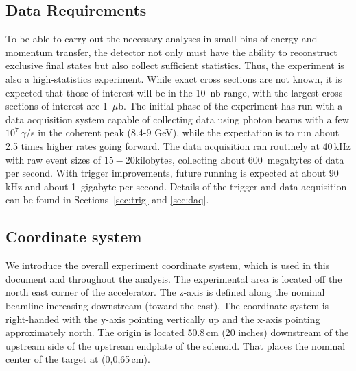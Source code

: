 \subsection{Data Requirements \label{sec:intro:data_requirements}}
To be able to carry out the necessary analyses in small bins of energy and momentum transfer, the detector not only must have the ability to reconstruct exclusive final states but also collect sufficient statistics. Thus, the \GX{} experiment is also a high-statistics experiment. While exact cross sections are not known, it is expected that those of interest will be in the 10~nb range, with the largest cross sections of interest are 1~$\mu$b. The initial phase of the \GX{} experiment has run with a data acquisition system capable of collecting data using photon beams with a few $10^{7}~\gamma/$s in the coherent peak (8.4-9 GeV), while the expectation is to run about 2.5 times higher rates going forward. %
The data acquisition ran routinely at 40\,kHz with raw event sizes of $15-20$kilobytes, collecting about 600~megabytes of data per second. With trigger improvements, future running is expected at about 90 kHz and about 1~gigabyte per second. Details of the trigger and data acquisition can be found in Sections~\ref{sec:trig} and \ref{sec:daq}.

\subsection{Coordinate system \label{sec:intro:coordinates}}
We introduce the overall experiment coordinate system, which is used in this document and throughout the analysis. The experimental area is located 
off the north east corner of the accelerator. The z-axis is defined along the nominal beamline increasing downstream (toward the east). The coordinate system 
is right-handed with the y-axis pointing vertically up and the x-axis pointing approximately north. 
The origin is located 50.8\,cm (20 inches) downstream of the upstream side of the upstream endplate of the solenoid. That places the nominal center of the target at (0,0,65\,cm).
